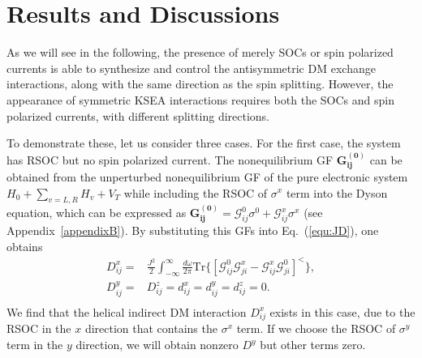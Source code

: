 \documentclass[aps,prb,twocolumn,showpacs,amssymb]{revtex4-1}
\begin{document}
\section{Results and Discussions}

As we will see in the following, the presence of merely SOCs or spin polarized currents is able to synthesize and control the antisymmetric DM exchange interactions, along with the same direction as the spin splitting. However, the appearance of symmetric KSEA interactions requires both the SOCs and spin polarized currents, with different splitting directions.

To demonstrate these, let us consider three cases. For the first case, the system has RSOC but no spin polarized current.
The nonequilibrium GF $\bm{G^{(0)}_{ij}}$ can be obtained from the unperturbed nonequilibrium GF of the pure electronic system $H_0+\sum_{v=L,R}H_{v}+V_T$ while including the RSOC of $\sigma^x$ term into the Dyson equation, which can be expressed as $\bm{G^{(0)}_{ij}}=\mathcal{G}^{0}_{ij}\sigma^{0}+\mathcal{G}^{x}_{ij}\sigma^{x}$ (see Appendix~\ref{appendixB}). By substituting this GFs into Eq.~(\ref{equ:JD}), one obtains
\begin{equation}\label{equ:Esd6}
\begin{aligned}
D^{x}_{ij}=&\frac{J^2}{2}\int^{\infty}_{-\infty}\frac{d\omega}{2\pi}\mathrm{Tr}\{[\mathcal{G}^{0}_{ij}\mathcal{G}^{x}_{ji}-\mathcal{G}^{x}_{ij}\mathcal{G}^{0}_{ji}]^{<}\},\\
D^{y}_{ij}=&D^{z}_{ij}=d^{x}_{ij}=d^{y}_{ij}=d^{z}_{ij}=0.\\
\end{aligned}
\end{equation}
We find that the helical indirect DM interaction $D^{x}_{ij}$ exists in this case, due to the RSOC in the $x$ direction that contains the $\sigma^x$ term. If we choose the RSOC of $\sigma^y$ term in the $y$ direction, we will obtain nonzero $D^y$ but other terms zero.
\end{document}
